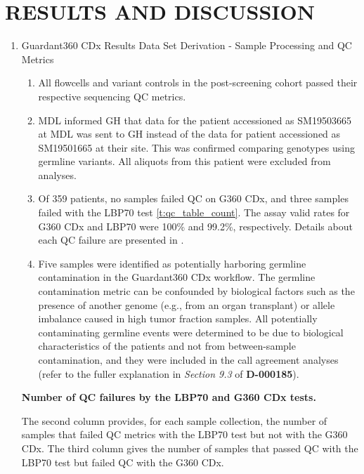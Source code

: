 \documentclass[12pt]{protocol}
\begin{document}
\section{RESULTS AND DISCUSSION}\label{s:results}

\begin{enumerate}

    \item Guardant360 CDx Results Data Set Derivation - Sample Processing and QC Metrics
	\begin{enumerate}
        \item All flowcells and variant controls in the post-screening cohort passed their
            respective sequencing QC metrics.
        \item MDL informed GH that data for the patient accessioned as SM19503665 at MDL was sent
            to GH instead of the data for patient accessioned as SM19501665 at their site.  This
            was confirmed comparing genotypes using germline variants.  All aliquots from this
            patient were excluded from analyses.
        \item Of 359 patients, no samples failed QC on G360 CDx, and three samples failed with the
            LBP70 test \cref{t:qc_table_count}.  The assay valid rates for G360 CDx and LBP70 were
            100\% and 99.2\%, respectively. Details about each QC failure are presented in
            .
         \item Five samples were identified as potentially harboring germline contamination in
             the Guardant360 CDx workflow. The germline contamination metric can be confounded
             by biological factors such as the presence of another genome (e.g., from an organ
             transplant) or allele imbalance caused in high tumor fraction samples. All
             potentially contaminating germline events were determined to be due to biological
             characteristics of the patients and not from between-sample contamination, and
             they were included in the call agreement analyses (refer to the fuller explanation
             in \emph{Section 9.3} of \textbf{D-000185}).
	\end{enumerate}

\captionsetup{justification=justified,singlelinecheck=off,skip=0pt}
\begin{table}[H]
\centering
\begin{threeparttable}
\caption[Number of QC failures by the LBP70 test and G360 CDx] {\textbf{Number of QC failures by
    the LBP70 and G360 CDx tests.}}\label{t:qc_table_count}

\caption*{The second column provides, for each sample collection, the  number of samples that
    failed QC metrics with the LBP70 test but not with the G360 CDx. The third column gives the
    number of samples that passed QC with the LBP70 test but failed QC with the G360 CDx.}
\end{threeparttable}
\end{table}
	

\end{enumerate}
\end{document}
